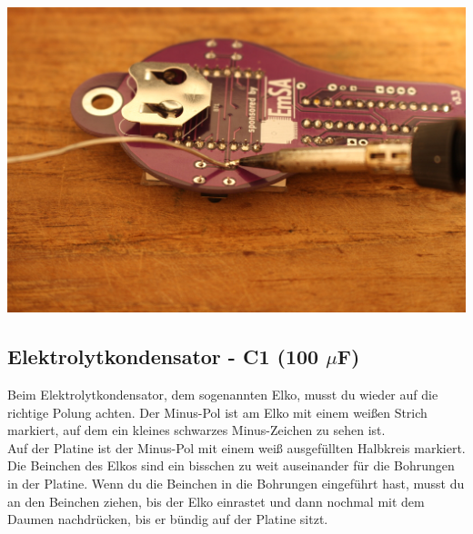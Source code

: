 \documentclass{article}
\begin{document}
\begin{minipage}[b]{0.5\textwidth}
	\includegraphics[width=\textwidth]{Bilder2024/IMG_0069.JPG}
\end{minipage}

\subsection{Elektrolytkondensator - C1 (100 $\mu$F)}

Beim Elektrolytkondensator, dem sogenannten Elko, musst du wieder auf die richtige Polung achten. Der Minus-Pol ist am Elko mit einem weißen Strich markiert, auf dem ein kleines schwarzes Minus-Zeichen zu sehen ist.\\

Auf der Platine ist der Minus-Pol mit einem weiß ausgefüllten Halbkreis markiert.\\

Die Beinchen des Elkos sind ein bisschen zu weit auseinander für die Bohrungen in der Platine. Wenn du die Beinchen in die Bohrungen eingeführt hast, musst du an den Beinchen ziehen, bis der Elko einrastet und dann nochmal mit dem Daumen nachdrücken, bis er bündig auf der Platine sitzt.

\vspace{1cm}
\end{document}
